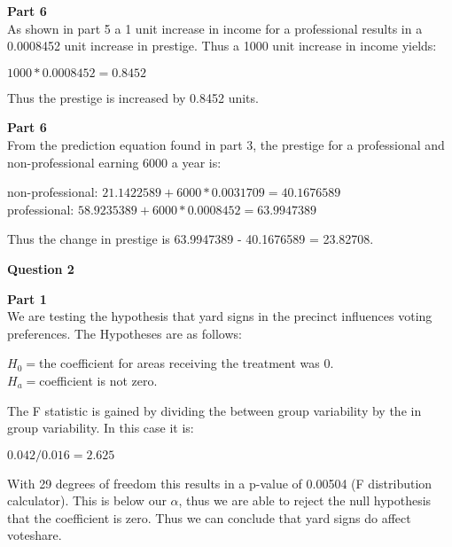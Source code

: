 \documentclass{article}
\begin{document}
\vspace{10mm}
\noindent\textbf{\large Part 6\\}	
As shown in part 5 a 1 unit increase in income for a professional results in a 0.0008452 unit increase in prestige. Thus a 1000 unit increase in income yields:
\begin{center}
	$1000 * 0.0008452 = 0.8452$
\end{center} 
Thus the prestige is increased by 0.8452 units.
	
\vspace{10mm}
\noindent\textbf{\large Part 6\\}	
From the prediction equation found in part 3, the prestige for a professional and non-professional earning 6000 a year is:
\begin{center}
	non-professional: $21.1422589 + 6000*0.0031709 = 40.1676589$\\
	professional: $58.9235389 + 6000*0.0008452 = 63.9947389$\\
\end{center}
Thus the change in prestige is 63.9947389 - 40.1676589 = 23.82708.
\pagebreak

	\textbf{\Large Question 2\\}

\noindent\textbf{\large Part 1\\}
We are testing the hypothesis that yard signs in the precinct influences voting preferences. The Hypotheses are as follows:
\begin{center}
	$H_{0} = $the coefficient for areas receiving the treatment was 0.\\
	$H_{a} = $coefficient is not zero.\\
\end{center}
The F statistic is gained by dividing the between group variability by the in group variability. In this case it is:
\begin{center}
	$0.042/0.016 = 2.625$
\end{center}
With 29 degrees of freedom this results in a p-value of 0.00504 (F distribution calculator). This is below our $\alpha$, thus we are able to reject the null hypothesis that the coefficient is zero. Thus we can conclude that yard signs do affect voteshare.\\
\end{document}
